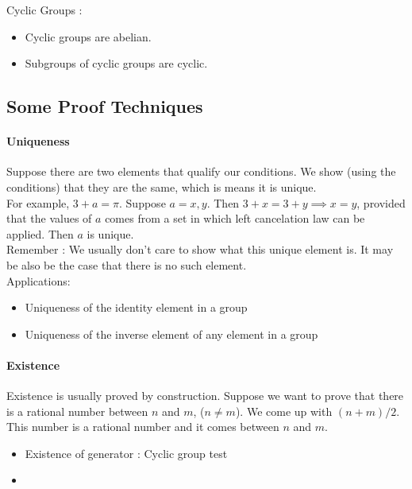 \begin{remark}[Results]
	Cyclic Groups :
	\begin{itemize}
		\item Cyclic groups are abelian.%
		\item Subgroups of cyclic groups are cyclic.%
	\end{itemize}
\end{remark}

\subsection{Some Proof Techniques}
\paragraph{Uniqueness}
	Suppose there are two elements that qualify our conditions. We show (using the conditions) that they are the same, which is means it is unique.\\

	For example, $3 + a = \pi$. Suppose $a = x,y$. Then $3 + x = 3 + y \implies x = y$, provided that the values of $a$ comes from a set in which left cancelation law can be applied. Then $a$ is unique.\\

	Remember : We usually don't care to show what this unique element is. It may be also be the case that there is no such element.\\

	Applications:
\begin{itemize}
	\item Uniqueness of the identity element in a group
	\item Uniqueness of the inverse element of any element in a group
\end{itemize}

\paragraph{Existence}
	Existence is usually proved by construction. Suppose we want to prove that there is a rational number between $n$ and $m$, ($n \ne m$). We come up with $(n+m)/2$. This number is a rational number and it comes between $n$ and $m$.
\begin{itemize}
	\item Existence of generator : Cyclic group test
	\item 
\end{itemize}
\pagebreak

